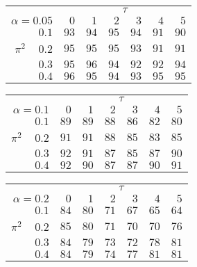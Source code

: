\begin{tabular}{r|rrrrrr}
\hline\hline
 &\multicolumn{6}{c}{$\tau$} \\ 
 $\alpha = 0.05$ & $0$ & $1$ & $2$ & $3$ & $4$ & $5$ \\ 
 \hline$0.1$ & $93$ & $94$ & $95$ & $94$ & $91$ & $90$\\ 
$\pi^2\;\;\;$ $0.2$ & $95$ & $95$ & $95$ & $93$ & $91$ & $91$\\ 
$0.3$ & $95$ & $96$ & $94$ & $92$ & $92$ & $94$\\ 
$0.4$ & $96$ & $95$ & $94$ & $93$ & $95$ & $95$\\ 
 \hline 
 \end{tabular}
 
 \vspace{2em} 
 
\begin{tabular}{r|rrrrrr}
\hline\hline
 &\multicolumn{6}{c}{$\tau$} \\ 
 $\alpha = 0.1$ & $0$ & $1$ & $2$ & $3$ & $4$ & $5$ \\ 
 \hline$0.1$ & $89$ & $89$ & $88$ & $86$ & $82$ & $80$\\ 
$\pi^2\;\;\;$ $0.2$ & $91$ & $91$ & $88$ & $85$ & $83$ & $85$\\ 
$0.3$ & $92$ & $91$ & $87$ & $85$ & $87$ & $90$\\ 
$0.4$ & $92$ & $90$ & $87$ & $87$ & $90$ & $91$\\ 
 \hline 
 \end{tabular}
 
 \vspace{2em} 
 
\begin{tabular}{r|rrrrrr}
\hline\hline
 &\multicolumn{6}{c}{$\tau$} \\ 
 $\alpha = 0.2$ & $0$ & $1$ & $2$ & $3$ & $4$ & $5$ \\ 
 \hline$0.1$ & $84$ & $80$ & $71$ & $67$ & $65$ & $64$\\ 
$\pi^2\;\;\;$ $0.2$ & $85$ & $80$ & $71$ & $70$ & $70$ & $76$\\ 
$0.3$ & $84$ & $79$ & $73$ & $72$ & $78$ & $81$\\ 
$0.4$ & $84$ & $79$ & $74$ & $77$ & $81$ & $81$\\ 
 \hline 
 \end{tabular}